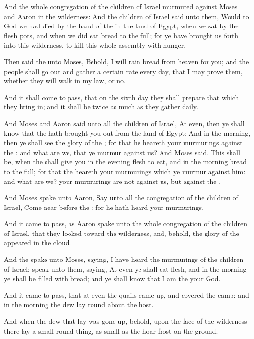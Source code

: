 \verse And the whole congregation of the children of Israel murmured against Moses and Aaron in the wilderness: \verse And the children of Israel said unto them, Would to God we had died by the hand of the \LORD in the land of Egypt, when we sat by the flesh pots, and when we did eat bread to the full; for ye have brought us forth into this wilderness, to kill this whole assembly with hunger.

\verse Then said the \LORD unto Moses, Behold, I will rain bread from heaven for you; and the people shall go out and gather a certain rate every day, that I may prove them, whether they will walk in my law, or no.

\verse And it shall come to pass, that on the sixth day they shall prepare that which they bring in; and it shall be twice as much as they gather daily.

\verse And Moses and Aaron said unto all the children of Israel, At even, then ye shall know that the \LORD hath brought you out from the land of Egypt: \verse And in the morning, then ye shall see the glory of the \LORD; for that he heareth your murmurings against the \LORD: and what are we, that ye murmur against us?  \verse And Moses said, This shall be, when the \LORD shall give you in the evening flesh to eat, and in the morning bread to the full; for that the \LORD heareth your murmurings which ye murmur against him: and what are we? your murmurings are not against us, but against the \LORD.

\verse And Moses spake unto Aaron, Say unto all the congregation of the children of Israel, Come near before the \LORD: for he hath heard your murmurings.

\verse And it came to pass, as Aaron spake unto the whole congregation of the children of Israel, that they looked toward the wilderness, and, behold, the glory of the \LORD appeared in the cloud.

\verse And the \LORD spake unto Moses, saying, \verse I have heard the murmurings of the children of Israel: speak unto them, saying, At even ye shall eat flesh, and in the morning ye shall be filled with bread; and ye shall know that I am the \LORD your God.

\verse And it came to pass, that at even the quails came up, and covered the camp: and in the morning the dew lay round about the host.

\verse And when the dew that lay was gone up, behold, upon the face of the wilderness there lay a small round thing, as small as the hoar frost on the ground.

